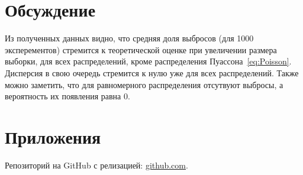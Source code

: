 \documentclass[12pt,a4paper]{scrartcl}
\begin{document}
\section{Обсуждение}
Из полученных данных видно, что средняя доля выбросов (для 1000 эксперементов) стремится к теоретической оценке при увеличении размера выборки, для всех распределений, кроме распределения Пуассона~\eqref{eq:Poisson}. Дисперсия в свою очередь стремится к нулю уже для всех распределений. Также можно заметить, что для равномерного распределения отсутвуют выбросы, а вероятность их появления равна 0.

\section{Приложения}
Репозиторий на GitHub с релизацией: \href{https://github.com/WiillyWonka/MatStat}{github.com}.
\end{document}

